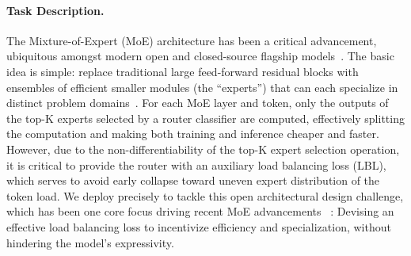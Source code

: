 \paragraph{Task Description.} The Mixture-of-Expert (MoE) architecture \citep{moe_sem_1, moe_sem_2, moe_mod_1_2exp, moe_mod_2_switch_1exp} has been a critical advancement, ubiquitous amongst modern open and closed-source flagship models~\citep{moe_gemini15, guo2025deepseek, llama4, moe_qwen3,  moe_gemini25}. The basic idea is simple: replace traditional large feed-forward residual blocks with ensembles of efficient smaller modules (the ``experts'') that can each specialize in distinct problem domains~\citep{moe_mod_2_switch_1exp}. For each MoE layer and token, only the outputs of the top-K experts selected by a router classifier are computed, effectively splitting the computation and making both training and inference cheaper and faster. However, due to the non-differentiability of the top-K expert selection operation, it is critical to provide the router with an auxiliary load balancing loss (LBL), which serves to avoid early collapse toward uneven expert distribution of the token load. We deploy \ouralgo precisely to tackle this open architectural design challenge, which has been one core focus driving recent MoE advancements ~\citep{moe_sem_2, moe_mod_2_switch_1exp, moe_lbl_evo1, moe_lbl_evo2_zloss, moe_lbl_evo3, moe_deepseek_moe, moe_deepseek_demon, moe_similar_olmoe}: Devising an effective load balancing loss to incentivize efficiency and specialization, without hindering the model's expressivity.

